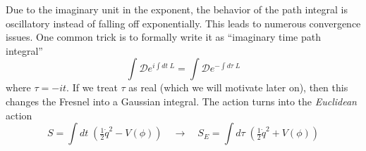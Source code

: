 \documentclass[12pt]{article}
\begin{document}
Due to the imaginary unit in the exponent, the behavior of the path
integral is oscillatory instead of falling off exponentially. This
leads to numerous convergence issues. One common trick is to formally
write it as ``imaginary time path integral''
\begin{equation}
  \int \mathcal{D} e^{i\int dt\; L} = 
  \int \mathcal{D} e^{-\int d\tau\; L}
\end{equation}
where $\tau = -i t$. If we treat $\tau$ as real (which we will
motivate later on), then this changes the Fresnel into a Gaussian
integral. The action turns into the \emph{Euclidean} action
\begin{equation}
  S = \int dt \; 
  \left( \tfrac{1}{2} \dot{q}^2 - V(\phi) \right) 
  \quad \longrightarrow \quad 
  S_E = \int d\tau \; 
  \left( \tfrac{1}{2} \dot{q}^2 + V(\phi) \right)
\end{equation}






 
\renewcommand{\refname}{Bibliography}

\end{document}
